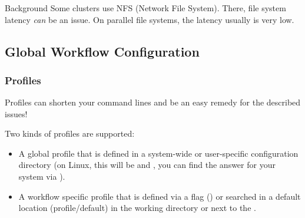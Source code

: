 \begin{frame}
  \frametitle{}
  \begin{docs}{Background}
  	Some clusters use NFS (Network File System). There, file system latency \emph{can} be an issue.\newline
  	\pause
  	On parallel file systems, the latency usually is very low. 
  \end{docs}	
\end{frame}


\subsection{Global Workflow Configuration}

\begin{frame}[fragile]
  \frametitle{\Snakemake{} Profiles}
  \begin{hint}
  	Profiles can shorten your command lines and be an easy remedy for the described issues!
  \end{hint}
  \pause
  Two kinds of profiles are supported:
  \begin{itemize}[<+->]
  	\item A global profile that is defined in a system-wide or user-specific configuration directory (on Linux, this will be  and , you can find the answer for your system via ).
  	\item A workflow specific profile that is defined via a flag () or searched in a default location (profile/default) in the working directory or next to the .
  \end{itemize}
\end{frame}

